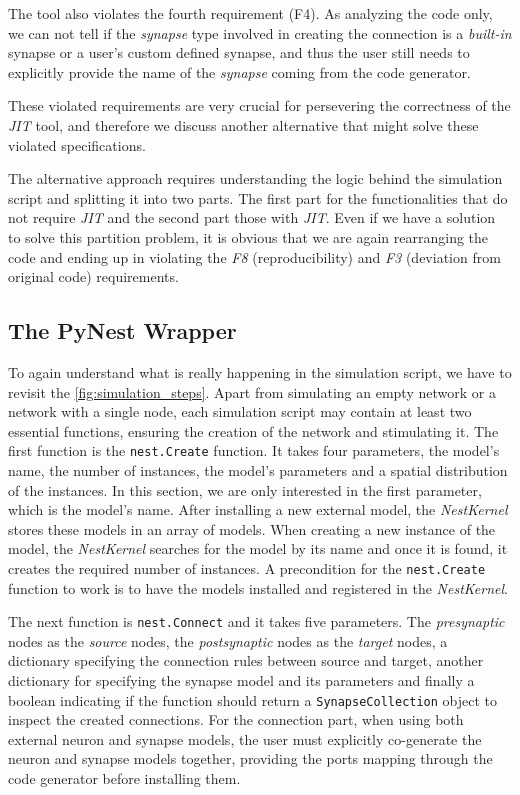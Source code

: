 The tool also violates the fourth requirement (F4). As analyzing the code only, we can not tell if the \emph{synapse} type involved in creating the connection is a \emph{built-in} synapse or a user's custom defined synapse, and thus the user still  needs to explicitly provide the name of the \emph{synapse} coming from the code generator. 

These violated requirements are very crucial for persevering the correctness of the \emph{JIT} tool, and therefore we discuss  another alternative that might solve these violated specifications.


The alternative approach requires understanding the logic behind the simulation script and splitting it into two parts. The first part for the functionalities that do not require \emph{JIT} and the second part those with \emph{JIT}. Even if we have a solution to solve this partition problem, it is obvious that we are again rearranging the code and ending up in violating the \emph{F8} (reproducibility) and \emph{F3} (deviation from original code) requirements.

\subsection{The PyNest Wrapper}

To again understand what is really happening in the simulation script, we have to revisit the \autoref{fig:simulation_steps}. Apart from simulating an empty network or a network with a single node, each simulation script may contain at least two essential functions, ensuring the creation of the network and stimulating it. The first function is the \texttt{nest.Create} function. It takes four parameters, the model's name, the number of instances, the model's parameters and a spatial distribution of the instances. In this section, we are only interested in the first parameter, which is the model's name. After installing a new external model, the \emph{NestKernel} stores these models in an array of models. When creating a new instance of the model, the \emph{NestKernel} searches for the model by its name and once it is found, it creates the required number of instances. A precondition for the \texttt{nest.Create} function to work is to have the models installed and registered in the \emph{NestKernel}.


The next function is \texttt{nest.Connect} and it takes five parameters. The \emph{presynaptic} nodes as the \emph{source} nodes, the \emph{postsynaptic} nodes as the \emph{target} nodes, a dictionary specifying the connection rules between source and target, another dictionary for specifying the synapse model and its parameters and finally a boolean indicating if the function should return a \texttt{SynapseCollection} object to inspect the created connections. For the connection part, when using both external neuron and synapse models, the user must explicitly co-generate the neuron and synapse models together, providing the ports mapping through the code generator before installing them.

